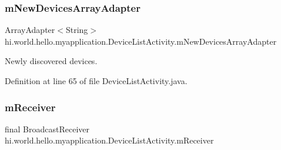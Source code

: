 \subsubsection{\texorpdfstring{mNewDevicesArrayAdapter}{mNewDevicesArrayAdapter}}
{\footnotesize\ttfamily Array\+Adapter$<$String$>$ hi.\+world.\+hello.\+myapplication.\+Device\+List\+Activity.\+m\+New\+Devices\+Array\+Adapter\hspace{0.3cm}{\ttfamily [private]}}



Newly discovered devices. 



Definition at line 65 of file Device\+List\+Activity.\+java.

\mbox{\label{classhi_1_1world_1_1hello_1_1myapplication_1_1_device_list_activity_aa946e1b25658fa8217545409eccb9cbf}} 
\subsubsection{\texorpdfstring{mReceiver}{mReceiver}}
{\footnotesize\ttfamily final Broadcast\+Receiver hi.\+world.\+hello.\+myapplication.\+Device\+List\+Activity.\+m\+Receiver\hspace{0.3cm}{\ttfamily [private]}}

